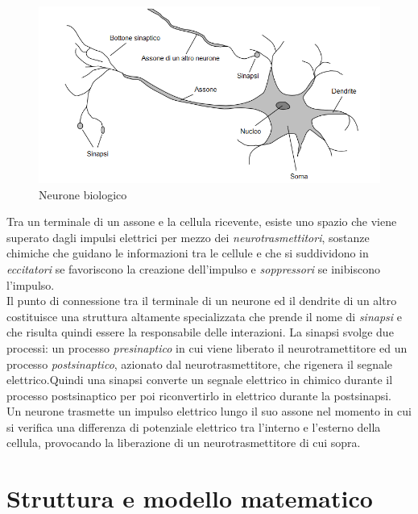 \documentclass[12pt,a4paper,oneside]{book}
\begin{document}
		 \begin{figure}[h]
		 	\centering
		 	\includegraphics[width=1\linewidth]{IMMAGINI/neuron}
		 	\caption{Neurone biologico}
		 	\label{fig:neuron}
		 \end{figure}
	 
	 	Tra un terminale di un assone e la cellula ricevente, esiste uno spazio che viene superato dagli impulsi elettrici per mezzo dei \emph{neurotrasmettitori}, sostanze chimiche che guidano le informazioni tra le cellule e che si suddividono in \emph{eccitatori} se favoriscono la creazione dell'impulso e \emph{soppressori} se inibiscono l'impulso.\\ Il punto di connessione tra il terminale di un neurone ed il dendrite di un altro costituisce una struttura altamente specializzata che prende il nome di \emph{sinapsi} e che risulta quindi essere la responsabile delle interazioni. La sinapsi svolge due processi: un processo \emph{presinaptico} in cui viene liberato il neurotramettitore ed un processo \emph{postsinaptico}, azionato dal neurotrasmettitore, che rigenera il segnale elettrico.Quindi una sinapsi converte un segnale elettrico in chimico durante il processo postsinaptico per poi riconvertirlo in elettrico durante la postsinapsi.\\ 
	 	Un neurone trasmette un impulso elettrico lungo il suo assone nel momento in cui si verifica una differenza di potenziale elettrico tra l’interno e l’esterno della cellula, provocando la liberazione di un neurotrasmettitore di cui sopra.
		
		
		 
		\section{Struttura e modello matematico}
		
\end{document}
